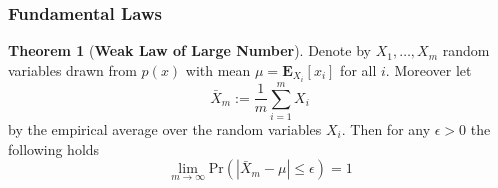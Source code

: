 \documentclass{article}
\theoremstyle{definition}
\newtheorem{theorem}{Theorem}
\begin{document}
\subsubsection{Fundamental Laws}
\begin{theorem}[\textbf{Weak Law of Large Number}]
	Denote by $X_1,\ldots,X_m$ random variables drawn from $p(x)$ with mean $\mu = \mathbf{E}_{X_i}[x_i]$ for all $i$. Moreover let
	\begin{equation}
	\bar{X}_m:=\frac{1}{m}\sum_{i=1}^m{X_i}
	\end{equation}
	by the empirical average over the random variables $X_i$. Then for any $\epsilon >0$ the following holds
	\begin{equation}
	\lim_{m\rightarrow \infty}{\text{Pr}(|\bar{X}_m-\mu|\le\epsilon)=1}
	\end{equation}
\end{theorem}
\end{document}

